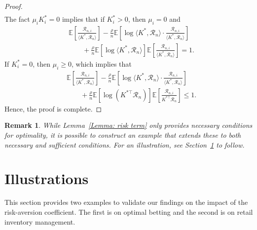 \documentclass[letterpaper, 10 pt, journal, twoside]{IEEEtran}  %
\newtheorem*{remark}{Remark}
\begin{document}
\begin{proof}
\begin{align*}
    \end{align*}
    The fact $\mu_i K_i^*=0$ implies that if $K_i^* > 0$, then $\mu_i = 0$ and
    \begin{align*}
        & \mathbb{E}\left[ \frac{\mathcal{R}_{n,i}}{ \langle K^{*}, \mathcal{R}_n \rangle } \right] 
        - \frac{\rho}{n} \mathbb{E}\left[ \log \langle K^{*}, \mathcal{R}_n \rangle \cdot \frac{\mathcal{R}_{n,i}}{\langle K^{*}, \mathcal{R}_n \rangle } \right] \\
        &\qquad + \frac{\rho}{n}\mathbb{E}\left[ \log \langle K^{*}, \mathcal{R}_n \rangle \right] \mathbb{E}\left[ \frac{\mathcal{R}_{n,i}}{\langle K^{*}, \mathcal{R}_n \rangle} \right] = 1.
    \end{align*}
    If $K_i^* = 0$, then $\mu_i \geq 0$, which implies that
    \begin{align*}
        & \mathbb{E}\left[ \frac{\mathcal{R}_{n,i}}{\langle K^{*}, \mathcal{R}_n \rangle } \right] - \frac{\rho}{n}\mathbb{E} \left[ \log \langle K^{*}, \mathcal{R}_n \rangle  \cdot \frac{\mathcal{R}_{n,i}}{\langle K^{*}, \mathcal{R}_n \rangle } \right] \\
        &\qquad +\frac{\rho}{n}\mathbb{E}\left[ \log(K^{*\top}\mathcal{R}_n) \right] \mathbb{E}\left[ \frac{\mathcal{R}_{n,i}}{K^{*\top}\mathcal{R}_n} \right] \leq 1.
    \end{align*}
Hence, the proof is complete.    
\end{proof}


\begin{remark}\rm
    While Lemma~\ref{Lemma: risk term} only provides necessary conditions for optimality, it is possible to construct an example that {\em extends} these to both necessary and sufficient conditions. For an illustration,  see Section~\ref{section: Illustrative Examples} to follow.
\end{remark}




\section{Illustrations} \label{section: Illustrative Examples}
This section provides two examples to validate our findings on the impact of the risk-aversion coefficient. The first is on optimal betting and the second is on retail inventory management.
\end{document}
